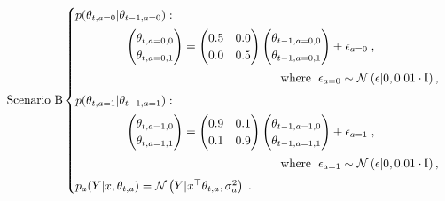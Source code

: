 \begin{equation}
\text{Scenario B}
\begin{cases}
	\vspace*{1ex}
	p(\theta_{t,a=0}|\theta_{t-1,a=0}): \\ \vspace*{1ex}
	\hspace*{10ex}\begin{pmatrix}
	\theta_{t,a=0,0}\\
	\theta_{t,a=0,1}\\
	\end{pmatrix} = \begin{pmatrix}
	0.5 & 0.0 \\
	0.0 & 0.5 \\
	\end{pmatrix} \begin{pmatrix}
	\theta_{t-1,a=0,0}\\
	\theta_{t-1,a=0,1}\\
	\end{pmatrix} + \epsilon_{a=0} \;, \\ \vspace*{1ex}
	\hspace*{40ex} \text{where } \;  \epsilon_{a=0} \sim \N{\epsilon|0,0.01 \cdot\mathrm{I}},\\
	
	\vspace*{1ex}
	p(\theta_{t,a=1}|\theta_{t-1,a=1}): \\ \vspace*{1ex}
	\hspace*{10ex}\begin{pmatrix}
	\theta_{t,a=1,0}\\
	\theta_{t,a=1,1}\\
	\end{pmatrix} = \begin{pmatrix}
	0.9 & 0.1 \\
	0.1 & 0.9 \\
	\end{pmatrix} \begin{pmatrix}
	\theta_{t-1,a=1,0}\\
	\theta_{t-1,a=1,1}\\
	\end{pmatrix} + \epsilon_{a=1} \;, \\ \vspace*{1ex}
	\hspace*{40ex} \text{where } \;  \epsilon_{a=1} \sim \N{\epsilon|0,0.01 \cdot\mathrm{I}}, \\
	
	p_a(Y|x,\theta_{t,a})=\N{Y|x^\top \theta_{t,a}, \sigma_a^2} \;.
\end{cases}
\label{eq:linear_mixing_dynamics_b}
\end{equation}
 
